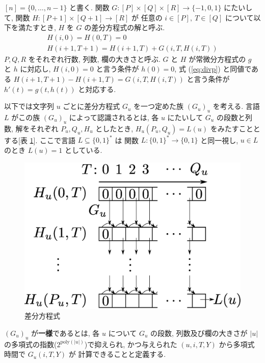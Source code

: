 $[n] = \{0, \dots , n-1\}$ と書く.
関数 $G \colon [P] \times [Q] \times [R] \to \{-1, 0, 1\}$ にたいして,
関数 $H \colon [P + 1] \times [Q+1] \to [R]$ が
任意の $i \in [P],\ T \in [Q]$ について以下を満たすとき,
$H$ を $G$ の差分方程式の解と呼ぶ.
\begin{gather}
   H(i, 0) = H(0, T) = 0 
\\
   H(i + 1, T + 1) = H(i+1, T) + G(i, T, H(i, T))  \label{eq:divp}
\end{gather}
$P, Q, R$ をそれぞれ行数, 列数, 欄の大きさと呼ぶ.
$G$ と $H$ が常微分方程式の $g$ と $h$ に対応し,
$H(i, 0) = 0$ と言う条件が $h(0) = 0$,
式 (\ref{eq:divp}) と同値である $H(i + 1, T + 1) - H(i+1, T) = G(i, T, H(i, T))$
と言う条件が $h'(t) = g(t, h(t))$ と対応する.

以下では文字列 $u$ ごとに差分方程式 $G _u$ を一つ定めた族 $(G _u) _u$ を考える. 
 言語 $L$ がこの族 $(G_u)_u$ によって認識されるとは,
 各 $u$ にたいして $G_u$ の段数と列数, 解をそれぞれ $P_u, Q_u, H_u$ としたとき,
 $H_u(P_u, Q_u) = L(u)$ をみたすこととする[表 \ref{fig:divp}].
ここで言語 $L \subseteq \{0, 1\} ^*$ は
関数 $L \colon \{0, 1\} ^* \to \{0, 1\}$ と同一視し, 
$u \in L$ のとき $L (u) = 1$ としている. 

 \begin{figure}
  \label{fig:divp}
  \begin{center}
   \includegraphics[height=0.2\textheight]{image/divp.eps}
  \end{center}
  \caption{差分方程式}
 \end{figure}

$(G_u)_u$ が{\bf 一様}であるとは,
各 $u$ について $G _u$ の段数, 列数及び欄の大きさが $|u|$ の多項式の指数($2^{\mathrm{poly} (|u|)}$)で抑えられ, 
かつ与えられた $(u, i, T, Y)$ から多項式時間で $G_u(i, T, Y)$ が
計算できることと定義する.


